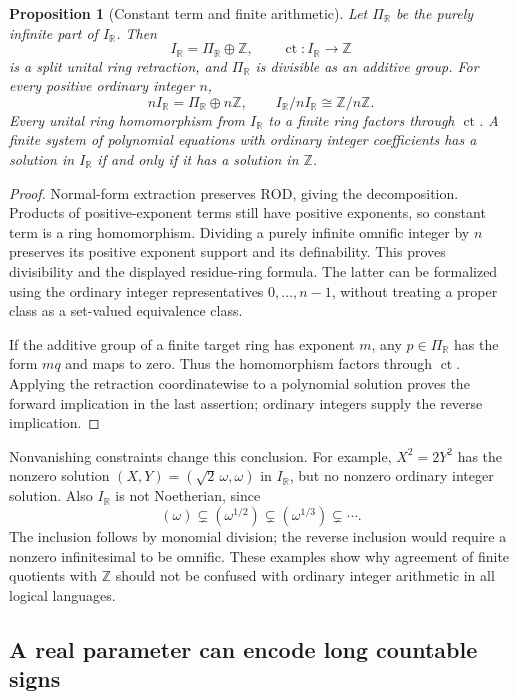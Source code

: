 \documentclass[11pt,a4paper]{article}
\numberwithin{equation}{section}
\newtheorem{proposition}[proposition]{Proposition}
\theoremstyle{definition}
\theoremstyle{remark}
\newcommand{\Z}{\mathbb Z}
\newcommand{\R}{\mathbb R}
\newcommand{\ct}{\operatorname{ct}}
\newcommand{\ROD}{\mathrm{ROD}}
\newcommand{\IR}{I_{\R}}
\begin{document}
\begin{proposition}[Constant term and finite arithmetic]\label{dsn:rp:prop:finite-arithmetic}
Let $\Pi_{\R}$ be the purely infinite part of $\IR$. Then
\[
 \IR=\Pi_{\R}\oplus\Z,
 \qquad \ct:\IR\longrightarrow\Z
\]
is a split unital ring retraction, and $\Pi_{\R}$ is divisible as an
additive group. For every positive ordinary integer $n$,
\[
 n\IR=\Pi_{\R}\oplus n\Z,\qquad
 \IR/n\IR\cong\Z/n\Z.
\]
Every unital ring homomorphism from $\IR$ to a finite ring factors
through $\ct$. A finite system of polynomial equations with ordinary
integer coefficients has a solution in $\IR$ if and only if it has a
solution in $\Z$.
\end{proposition}
\begin{proof}
Normal-form extraction preserves $\ROD$, giving the decomposition.
Products of positive-exponent terms still have positive exponents, so
constant term is a ring homomorphism. Dividing a purely infinite
omnific integer by $n$ preserves its positive exponent support and its
definability. This proves divisibility and the displayed residue-ring
formula. The latter can be formalized using the ordinary integer
representatives $0,\ldots,n-1$, without treating a proper class as a
set-valued equivalence class.

If the additive group of a finite target ring has exponent $m$, any
$p\in\Pi_{\R}$ has the form $mq$ and maps to zero. Thus the homomorphism
factors through $\ct$. Applying the retraction coordinatewise to a
polynomial solution proves the forward implication in the last
assertion; ordinary integers supply the reverse implication.
\end{proof}

Nonvanishing constraints change this conclusion. For example,
$X^2=2Y^2$ has the nonzero solution
$(X,Y)=(\sqrt2\,\omega,\omega)$ in $\IR$, but no nonzero ordinary integer
solution. Also $\IR$ is not Noetherian, since
\[
 (\omega)\subsetneq(\omega^{1/2})\subsetneq
 (\omega^{1/3})\subsetneq\cdots.
\]
The inclusion follows by monomial division; the reverse inclusion
would require a nonzero infinitesimal to be omnific. These examples
show why agreement of finite quotients with $\Z$ should not be confused
with ordinary integer arithmetic in all logical languages.

\subsection{A real parameter can encode long countable signs}
\end{document}
